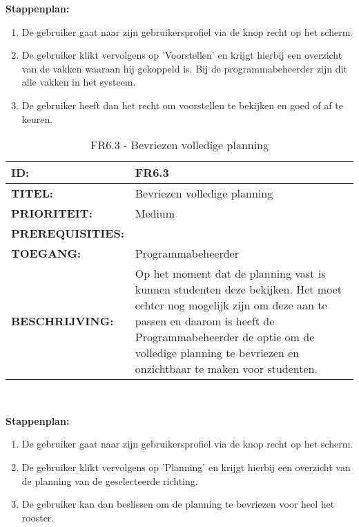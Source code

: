 \textbf{Stappenplan:}
	\begin{enumerate}
	\item De gebruiker gaat naar zijn gebruikersprofiel via de knop recht op het scherm.
	\item De gebruiker klikt vervolgens op 'Voorstellen' en krijgt hierbij een overzicht van de vakken waaraan hij gekoppeld is. Bij de programmabeheerder zijn dit alle vakken in het systeem.
	\item De gebruiker heeft dan het recht om voorstellen te bekijken en goed of af te keuren.
	\end{enumerate}	        
        
\noindent\begin{table}[H]
            \begin{tabular}{l | p{10cm}}
                \textbf{ID:} & FR6.3 \\ \hline
                \textbf{TITEL:} & Bevriezen volledige planning\\ \hline
                \textbf{PRIORITEIT:} &  Medium \\ \hline
                \textbf{PREREQUISITIES:} & \\ \hline
                \textbf{TOEGANG:} & Programmabeheerder \\ \hline
                \textbf{BESCHRIJVING:} & Op het moment dat de planning vast is kunnen studenten deze bekijken. Het moet echter nog mogelijk zijn om deze aan te passen en daarom is heeft de Programmabeheerder de optie om de volledige planning te bevriezen en onzichtbaar te maken voor studenten.\\ 
            \end{tabular}\\
            \caption{FR6.3 - Bevriezen volledige planning}
            \label{tab:FR6.3 - Bevriezen volledige planning}
        \end{table}   

\textbf{Stappenplan:}
	\begin{enumerate}
	\item De gebruiker gaat naar zijn gebruikersprofiel via de knop recht op het scherm.
	\item De gebruiker klikt vervolgens op 'Planning' en krijgt hierbij een overzicht van de planning van de geselecteerde richting.
	\item De gebruiker kan dan beslissen om de planning te bevriezen voor heel het rooster.
	\end{enumerate}	 


\clearpage